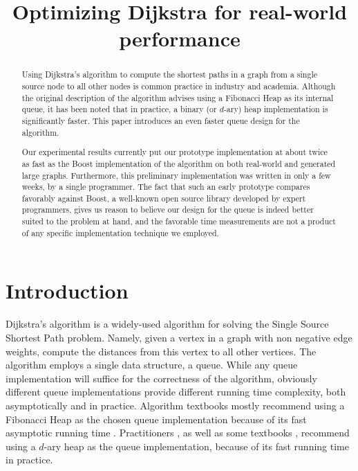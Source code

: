 \documentclass[conference,10pt,twocolumn]{IEEEtran}
\begin{document}
\title{Optimizing {D}ijkstra for real-world performance}

\author{
}







\maketitle

\begin{abstract}

Using Dijkstra's algorithm to compute the shortest paths in a graph from a single source node to all other nodes is common practice in industry and academia. Although the original description of the algorithm advises using a Fibonacci Heap as its internal queue, it has been noted that in practice, a binary (or $d$-ary) heap implementation is significantly faster. This paper introduces an even faster queue design for the algorithm. 

Our experimental results currently put our prototype implementation at about twice as fast as the Boost implementation of the algorithm on both real-world and generated large graphs. Furthermore, this preliminary implementation was written in only a few weeks, by a single programmer. The fact that such an early prototype compares favorably against Boost, a well-known open source library developed by expert programmers, gives us reason to believe our design for the queue is indeed better suited to the problem at hand, and the favorable time measurements are not a product of any specific implementation technique we employed.

\end{abstract}

\section{Introduction}

Dijkstra's algorithm is a widely-used algorithm for solving the Single Source Shortest Path problem. Namely, given a vertex in a graph with non negative edge weights, compute the distances from this vertex to all other vertices. The algorithm employs a single data structure, a queue.  While any queue implementation will suffice for the correctness of the algorithm, obviously different queue implementations provide different running time complexity, both asymptotically and in practice. Algorithm textbooks mostly recommend using a Fibonacci Heap as the chosen queue implementation because of its fast asymptotic running time \cite{Cormen90}. Practitioners \cite{Boost}, as well as some textbooks \cite{Cormen90}, recommend using a $d$-ary heap as the queue implementation, because of its fast running time in practice.
\end{document}
